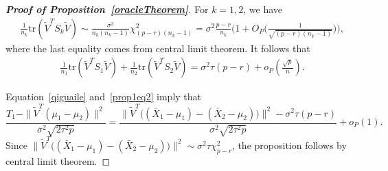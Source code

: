 \documentclass[review]{elsarticle}
\theoremstyle{plain}
\theoremstyle{definition}
\theoremstyle{remark}
\begin{document}
\begin{proof}[\textbf{Proof of Proposition~\ref{oracleTheorem}}]
    For $k=1,2$, we have
    \begin{equation*}
        \begin{aligned}
            &\frac{1}{n_k} \mathrm{tr}(\tilde{V}^T S_k \tilde{V})\sim \frac{\sigma^2}{n_k(n_k-1)}\chi^2_{(p-r)(n_k-1)}
            =
            \sigma^2\frac{p-r}{n_k}\Big(1+O_P\big(\frac{1}{\sqrt{(p-r)(n_k-1)}}\big)\Big),
        \end{aligned}
    \end{equation*}
    where the last equality comes from central limit theorem. It follows that
    \begin{equation}\label{prop1eq2}
        \begin{aligned}
            &\frac{1}{n_1} \mathrm{tr}(\tilde{V}^T S_1 \tilde{V})+
            \frac{1}{n_2} \mathrm{tr}(\tilde{V}^T S_2 \tilde{V})=\sigma^2 \tau (p-r)+o_P(\frac{\sqrt{p}}{n}).
        \end{aligned}
    \end{equation}

    Equation~\eqref{qiguaile} and~\eqref{prop1eq2} imply that
            $$
            \frac{T_1-\|\tilde{V}^T(\mu_1-\mu_2)\|^2}{\sigma^2\sqrt{2\tau^2 p}}
            =
            \frac{\|\tilde{V}^T \big( (\bar{X}_1-\mu_1)-(\bar{X}_2-\mu_2) \big)\|^2-
                \sigma^2 \tau (p-r)}{\sigma^2\sqrt{2\tau^2 p}}
                +o_P(1).
    $$
    Since
$\|\tilde{V}^T \big( (\bar{X}_1-\mu_1)-(\bar{X}_2-\mu_2) \big)\|^2\sim \sigma^2\tau\chi^2_{p-r}$,
the proposition follows by central limit theorem.
\end{proof}
\end{document}
